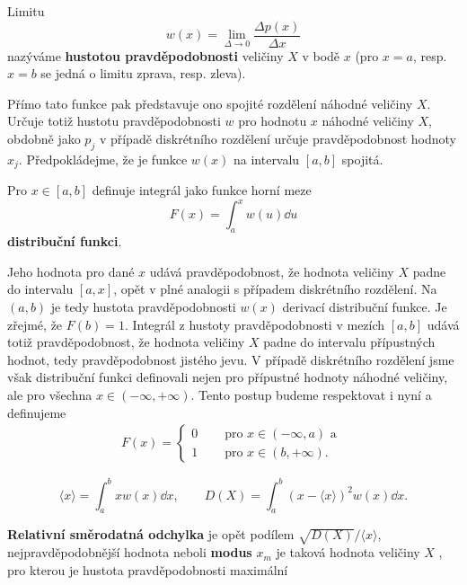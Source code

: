       \begin{mdframed}[style=highlight]
        Limitu
        \begin{equation}\label{mai:eq066}
          w(x) = \lim\limits_{\Delta\longrightarrow0}\dfrac{\Delta p(x)}{\Delta x}
        \end{equation}
        nazýváme \textbf{hustotou pravděpodobnosti} veličiny \(X\) v bodě \(x\) (pro \(x = a\), 
        resp. \(x = b\) se jedná o limitu zprava, resp. zleva).
      \end{mdframed}
      
      Přímo tato funkce pak představuje ono spojité rozdělení náhodné veličiny \(X\). Určuje totiž
      hustotu pravděpodobnosti \(w\) pro hodnotu \(x\) náhodné veličiny \(X\), obdobně jako \(p_j\) 
      v případě diskrétního rozdělení určuje pravděpodobnost hodnoty \(x_j\). Předpokládejme, že je 
      funkce \(w(x)\) na intervalu \([a, b]\) spojitá.
  
      \begin{mdframed}[style=highlight]
        Pro \(x \in [a, b]\) definuje integrál jako funkce horní meze
        \begin{equation}\label{mai:eq067}
          F(x) = \int_a^xw(u)\dd{u}
        \end{equation}
        \textbf{distribuční funkci}.
      \end{mdframed}
      Jeho hodnota pro dané \(x\) udává pravděpodobnost, že hodnota veličiny \(X\) padne do
      intervalu \([a, x]\), opět v plné analogii s případem diskrétního rozdělení. Na \((a, b)\) je
      tedy hustota pravděpodobnosti \(w(x)\) derivací distribuční funkce. Je zřejmé, že \(F(b) =
      1\). Integrál z hustoty pravděpodobnosti v mezích \([a, b]\) udává totiž pravděpodobnost, že
      hodnota veličiny \(X\) padne do intervalu přípustných hodnot, tedy pravděpodobnost jistého
      jevu. V případě diskrétního rozdělení jsme však distribuční funkci definovali nejen pro
      přípustné hodnoty náhodné veličiny, ale pro všechna \(x \in (-\infty, +\infty)\). Tento postup
      budeme respektovat i nyní a definujeme
      \begin{align*}
        F(x) =
          \begin{cases}
            0 &\quad\text{ pro }x \in (-\infty,a)\text{ a }  \\
            1 &\quad\text{ pro }x \in (b , +\infty).
          \end{cases}
      \end{align*}
      \begin{mdframed}[style=highlight]
        \begin{equation}\label{mai:eq068}
          \langle x \rangle = \int_a^bxw(x)\dd{x}, \qquad 
                       D(X) = \int_{a}^{b}(x - \langle x \rangle)^2w(x)\dd{x}.
        \end{equation}
      \end{mdframed}
      \textbf{Relativní směrodatná odchylka} je opět podílem \(\sqrt{D(X)}/\langle x \rangle\), 
      nejpravděpodobnější hodnota neboli \textbf{modus} \(x_m\) je taková hodnota veličiny \(X\) , 
      pro kterou je hustota pravděpodobnosti maximální
      
